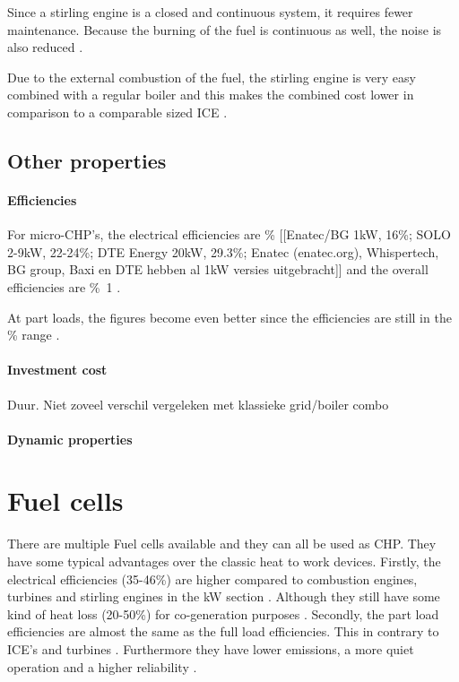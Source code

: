 Since a stirling engine is a closed and continuous system, it requires fewer maintenance. Because the burning of the fuel is continuous as well, the noise is also reduced \cite{Onovwiona2006}.

Due to the external combustion of the fuel, the stirling engine is very easy combined with a regular boiler and this makes the combined cost lower in comparison to a comparable sized ICE \cite{??}.
\subsection{Other properties}
\paragraph{Efficiencies}
For micro-CHP's, the electrical efficiencies are \unit[20-40]{\%} [[Enatec/BG 1kW, 16\%; SOLO 2-9kW, 22-24\%; DTE Energy 20kW, 29.3\%; Enatec (enatec.org), Whispertech, BG group, Baxi en DTE hebben al 1kW versies uitgebracht]] and the overall efficiencies are \unit[80-95]{\%1} \cite{Onovwiona2006}.

At part loads, the figures become even better since the efficiencies are still in the \unit[20-35]{\%} range \cite{Onovwiona2006}.
\paragraph{Investment cost}
Duur. Niet zoveel verschil vergeleken met klassieke grid/boiler combo
\paragraph{Dynamic properties}

\section{Fuel cells}
There are multiple Fuel cells available and they can all be used as CHP. They have some typical advantages over the classic heat to work devices. Firstly, the electrical efficiencies (35-46\%) are higher compared to combustion engines, turbines and stirling engines in the \unit[1-50]{kW} section \cite{Onovwiona2006}. Although they still have some kind of heat loss (20-50\%) for co-generation purposes \cite{Onovwiona2006}. Secondly, the part load efficiencies are almost the same as the full load efficiencies. This in contrary to ICE's and turbines \cite{Onovwiona2006}. Furthermore they have lower emissions, a more quiet operation and a higher reliability \cite{Zhu2002}.
